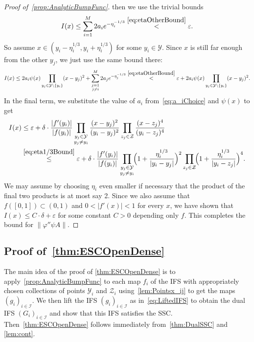 \documentclass[11pt,]{article}
\def\cref#1{\ref{#1}}%
\theoremstyle{definition}
\theoremstyle{remark}
\newcommand{\0}{\mathbf{0}}
\numberwithin{equation}{section}
\begin{document}
\begin{proof}[Proof of~\cref{prop:AnalyticBumpFunc}]
then we use the trivial bounds
\begin{equation*}
	I(x) \leq \sum_{i=1}^{M} 2a_ie^{-\eta_i^{-1/3}} \stackrel{\eqref{eq:etaOtherBound}}{<} \varepsilon.
\end{equation*}
So assume $x\in(y_i-\eta_i^{1/3}, y_i+\eta_i^{1/3})$ for some $y_i\in\mathcal{Y}$. Since $x$ is
still far enough from the other $y_j$, we just use the same bound there:
\begin{equation*}
	I(x) \leq 2a_i \psi(x) \prod_{y_j\in\mathcal{Y}\setminus\{y_i\}} (x-y_j)^2 +
	\sum_{\substack{j=1 \\ j\neq i}}^{M} 2a_j e^{-\eta_j^{-1/3}}
	\stackrel{\eqref{eq:etaOtherBound}}{<} \varepsilon + 2a_i \psi(x)
	\prod_{y_j\in\mathcal{Y}\setminus\{y_i\}} (x-y_j)^2.
\end{equation*}
In the final term, we substitute the value of $a_i$ from~\cref{eq:a_iChoice} and $\psi(x)$ to get
\begin{align*}
	I(x)&\leq \varepsilon+ \delta \cdot \frac{|f'(y_i)|}{|f(y_i)|} \prod_{\substack{y_j\in\mathcal{Y} \\
	y_j\neq y_i}} \frac{(x-y_j)^2}{(y_i - y_j)^2}  \prod_{z_j\in\mathcal{Z}}
	\frac{(x-z_j)^4}{(y_i - z_j)^4} \\
	&\stackrel{\eqref{eq:eta1/3Bound}}{\leq}  \varepsilon+  \delta \cdot
	\frac{|f'(y_i)|}{|f(y_i)|}\prod_{\substack{y_j\in\mathcal{Y} \\ y_j\neq y_i}}\!\! \Big(
	1+\frac{\eta_i^{1/3}}{|y_i-y_j|} \Big)^2 \prod_{z_j\in\mathcal{Z}}\!\! \Big(
      1+\frac{\eta_i^{1/3}}{|y_i-z_j|} \Big)^4. 
\end{align*}
We may assume by choosing $\eta_i$ even smaller if necessary that the product of the final two
products is at most say 2. Since we also assume that $f([0,1])\subset (0,1)$ and $0<|f'(x)|<1$ for
every $x$, we have shown that $I(x)\leq C\cdot\delta+\varepsilon$ for some constant $C>0$ depending
only $f$. This completes the bound for $\| \varphi'' \psi A\|$. 
\end{proof}

\subsection{Proof of~\cref{thm:ESCOpenDense}}

The main idea of the proof of \cref{thm:ESCOpenDense} is to apply~\cref{prop:AnalyticBumpFunc} to
each map $f_i$ of the IFS with appropriately chosen collections of points $\mathcal{Y}_i$ and
$\mathcal{Z}_i$ using~\cref{lem:Pointsx_ij} to get the maps $(g_i)_{i\in\mathcal{I}}$. We then lift
the IFS $(g_i)_{i\in\mathcal{I}}$ as in~\cref{eq:LiftedIFS} to obtain the dual IFS
$(G_i)_{i\in\mathcal{I}}$ and show that this
IFS satisfies the SSC. Then~\cref{thm:ESCOpenDense} follows immediately from~\cref{thm:DualSSC} and
\cref{lem:cont}.
\end{document}
